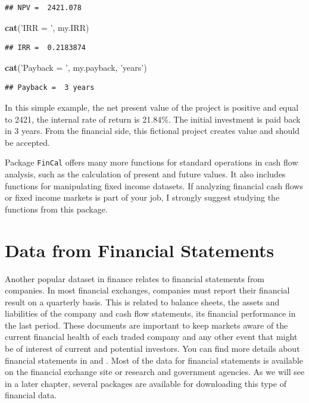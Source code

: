 \documentclass[11pt,]{book}
\newenvironment{Shaded}{\begin{snugshade}}{\end{snugshade}}
\newcommand{\KeywordTok}[1]{\textcolor[rgb]{0.27,0.27,0.27}{\textbf{#1}}}
\newcommand{\StringTok}[1]{\textcolor[rgb]{0.5,0.5,0.5}{#1}}
\newcommand{\NormalTok}[1]{#1}
\begin{document}
\begin{verbatim}
## NPV =  2421.078
\end{verbatim}

\begin{Shaded}
\begin{Highlighting}[]
\KeywordTok{cat}\NormalTok{(}\StringTok{'IRR = '}\NormalTok{, my.IRR)}
\end{Highlighting}
\end{Shaded}

\begin{verbatim}
## IRR =  0.2183874
\end{verbatim}

\begin{Shaded}
\begin{Highlighting}[]
\KeywordTok{cat}\NormalTok{(}\StringTok{'Payback = '}\NormalTok{, my.payback, }\StringTok{'years'}\NormalTok{)}
\end{Highlighting}
\end{Shaded}

\begin{verbatim}
## Payback =  3 years
\end{verbatim}

In this simple example, the net present value of the project is positive
and equal to 2421, the internal rate of return is 21.84\%. The initial
investment is paid back in 3 years. From the financial side, this
fictional project creates value and should be accepted.

Package \texttt{FinCal} offers many more functions for standard
operations in cash flow analysis, such as the calculation of present and
future values. It also includes functions for manipulating fixed income
datasets. If analyzing financial cash flows or fixed income markets is
part of your job, I strongly suggest studying the functions from this
package.

\section{Data from Financial
Statements}\label{data-from-financial-statements}

Another popular dataset in finance relates to financial statements from
companies. In most financial exchanges, companies must report their
financial result on a quarterly basis. This is related to balance
sheets, the assets and liabilities of the company and cash flow
statements, its financial performance in the last period. These
documents are important to keep markets aware of the current financial
health of each traded company and any other event that might be of
interest of current and potential investors. You can find more details
about financial statements in \citet{penman2007financial} and
\citet{ittelson1998financial}. Most of the data for financial statements
is available on the financial exchange site or research and government
agencies. As we will see in a later chapter, several packages are
available for downloading this type of financial data.
\end{document}
